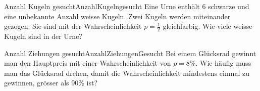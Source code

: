 \begin{bsp}
  {Anzahl Kugeln gesucht}{AnzahlKugelngesucht}
  Eine Urne enthält 6 schwarze und eine unbekannte Anzahl weisse Kugeln. Zwei Kugeln werden miteinander gezogen. Sie sind mit der Wahrscheinlichkeit \(p=\frac{1}{2}\) gleichfarbig. Wie viele weisse Kugeln sind in der Urne?


  \vspace*{8.5cm}
\end{bsp}
\begin{bsp}
  {Anzahl Ziehungen gesucht}{AnzahlZiehungenGesucht}
  Bei einem Glücksrad gewinnt man den Hauptpreis mit einer Wahrscheinlichkeit von \(p=8\%\). Wie häufig muss man das Glücksrad drehen, damit die Wahrscheinlichkeit mindestens einmal zu gewinnen, grösser als 90\% ist?


  \vspace*{8.5cm}
\end{bsp}
\clearpage
